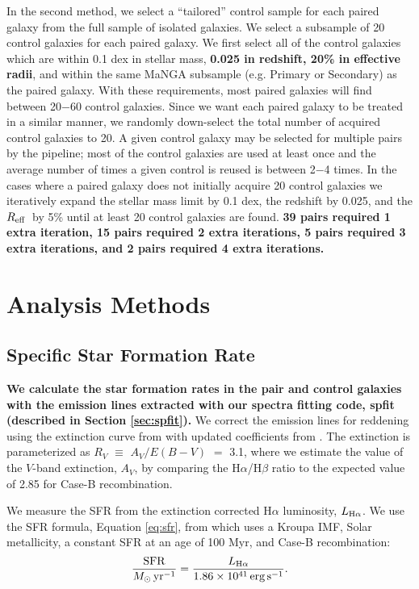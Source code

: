 \documentclass[iop,revtex4,twocolumn,apj,numberedappendix,appendixfloats]{emulateapj}
\newcommand{\reff}{$R_{\rm eff}$}
\begin{document}
In the second method, we select a ``tailored'' control sample for each paired galaxy from the full sample of isolated galaxies. We select a subsample of 20 control galaxies for each paired galaxy. We first select all of the control galaxies which are within 0.1 dex in stellar mass, \textbf{0.025 in redshift, 20\% in effective radii}, and within the same MaNGA subsample (e.g. Primary or Secondary) as the paired galaxy. With these requirements, most paired galaxies will find between 20$-$60 control galaxies. Since we want each paired galaxy to be treated in a similar manner, we randomly down-select the total number of acquired control galaxies to 20. A given control galaxy may be selected for multiple pairs by the pipeline; most of the control galaxies are used at least once and the average number of times a given control is reused is between 2$-$4 times. In the cases where a paired galaxy does not initially acquire 20 control galaxies we iteratively expand the stellar mass limit by 0.1 dex, the redshift by 0.025, and the \reff\ by 5\% until at least 20 control galaxies are found. \textbf{39 pairs required 1 extra iteration, 15 pairs required 2 extra iterations, 5 pairs required 3 extra iterations, and 2 pairs required 4 extra iterations. }

\section{Analysis Methods}\label{sec:analysis}

\subsection{Specific Star Formation Rate}
\textbf{We calculate the star formation rates in the pair and control galaxies with the emission lines extracted with our spectra fitting code, {\sc spfit} (described in Section \ref{sec:spfit}).} We correct the emission lines for reddening using the extinction curve from \citet{Cardelli:1989} with updated coefficients from \citet{ODonnell:1994}. The extinction is parameterized as $R_V$ $\equiv$ $A_V/E(B-V)$ $=$ 3.1, where we estimate the value of the $V$-band extinction, $A_V$, by comparing the H$\alpha$/H$\beta$ ratio to the expected value of 2.85 for Case-B recombination. 

We measure the SFR from the extinction corrected H$\alpha$ luminosity, $L_{{\rm H}\alpha}$. We use the SFR formula, Equation \ref{eq:sfr}, from \citet{Murphy:2011} which uses a Kroupa IMF, Solar metallicity, a constant SFR at an age of 100 Myr, and Case-B recombination: 
\begin{equation}\label{eq:sfr}
\frac{\rm{SFR}}{M_{\odot} \, \rm{yr^{-1}}} = \frac{L_{\rm H\alpha}}{1.86 \times 10^{41}\, \rm{erg\,s}^{-1}}.
\end{equation}
\end{document}
